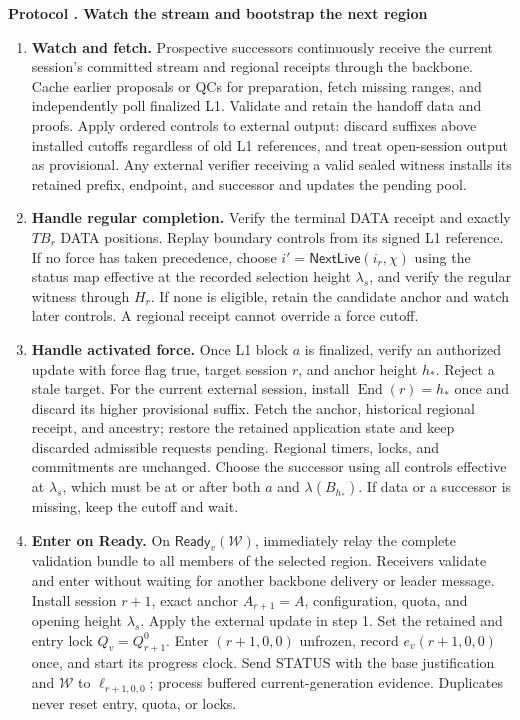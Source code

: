 \documentclass[11pt,a4paper]{article}
\newcommand{\tagg}[1]{\ensuremath{\mathsf{#1}}}
\newcounter{protocol}
\newenvironment{protocol}[2]{\refstepcounter{protocol}\label{#1}
\begin{mdframed}[nobreak=true,linewidth=.6pt,skipabove=8pt,skipbelow=8pt,
innertopmargin=7pt,innerbottommargin=7pt]\small
\textbf{Protocol \theprotocol. #2}\par\smallskip}{\end{mdframed}}
\begin{document}
\begin{protocol}{alg:bootstrap}{Watch the stream and bootstrap the next region}
\color{rrRed}
\begin{enumerate}[label=\textbf{\arabic*)},itemsep=5pt]
\item \textbf{Watch and fetch.} Prospective successors continuously
receive the current session's committed stream and regional receipts
through the backbone. Cache earlier proposals or QCs for preparation,
fetch missing ranges, and independently poll finalized L1.
Validate and retain the handoff data and proofs. Apply ordered controls
to external output: discard suffixes above installed cutoffs regardless
of old L1 references, and treat open-session output as provisional.
Any external verifier receiving a valid sealed witness installs its
retained prefix, endpoint, and successor and updates the pending pool.

\item \textbf{Handle regular completion.} Verify the terminal DATA
receipt and exactly $TB_r$ DATA positions. Replay boundary controls from
its signed L1 reference. If no force has taken precedence, choose
$i'=\tagg{NextLive}(i_r,\chi)$ using the status map effective at the
recorded selection height $\lambda_s$, and verify the regular witness
through $H_r$. If none is eligible, retain the candidate anchor and
watch later controls. A regional receipt cannot override a force cutoff.

\item \textbf{Handle activated force.} Once L1 block $a$ is finalized,
verify an authorized update with force flag true, target session $r$,
and anchor height $h_*$. Reject a stale target. For the current external
session, install $\operatorname{End}(r)=h_*$ once and discard its higher
provisional suffix. Fetch the anchor, historical regional receipt, and
ancestry; restore the retained application state and keep discarded
admissible requests pending. Regional timers, locks, and commitments
are unchanged. Choose the successor using all controls effective at
$\lambda_s$, which must be at or after both $a$ and $\lambda(B_{h_*})$.
If data or a successor is missing, keep the cutoff and wait.

\item \textbf{Enter on Ready.} On $\tagg{Ready}_v(\mathcal W)$, immediately
relay the complete validation bundle to all members of the selected
region. Receivers validate and enter without waiting for another backbone
delivery or leader message. Install session $r+1$, exact anchor $A_{r+1}=A$,
configuration, quota, and opening height $\lambda_s$. Apply the external
update in step 1. Set the retained and entry lock $Q_v=Q_{r+1}^0$.
Enter $(r+1,0,0)$ unfrozen, record $e_v(r+1,0,0)$ once, and start its
progress clock. Send STATUS with the base justification and $\mathcal W$
to $\ell_{r+1,0,0}$; process buffered current-generation evidence.
Duplicates never reset entry, quota, or locks.


\end{enumerate}
\end{protocol}
\end{document}
